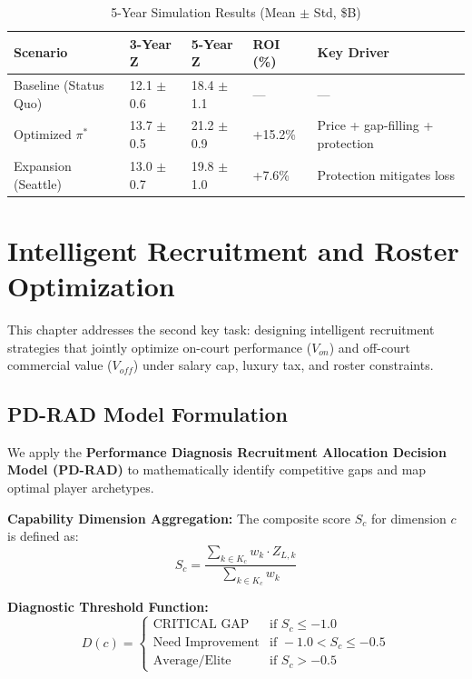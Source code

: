 \documentclass[12pt]{article}
\begin{document}
\begin{table}[H]
\centering
\caption{5-Year Simulation Results (Mean $\pm$ Std, \$B)}
\begin{tabular}{lllll}
\toprule
\textbf{Scenario} & \textbf{3-Year Z} & \textbf{5-Year Z} & \textbf{ROI (\%)} & \textbf{Key Driver} \\
\midrule
Baseline (Status Quo) & 12.1 $\pm$ 0.6 & 18.4 $\pm$ 1.1 & — & — \\
Optimized $\pi^*$ & 13.7 $\pm$ 0.5 & 21.2 $\pm$ 0.9 & +15.2\% & Price + gap-filling + protection \\
Expansion (Seattle) & 13.0 $\pm$ 0.7 & 19.8 $\pm$ 1.0 & +7.6\% & Protection mitigates loss \\
\bottomrule
\end{tabular}
\end{table}

\section{Intelligent Recruitment and Roster Optimization}
This chapter addresses the second key task: designing intelligent recruitment strategies that jointly optimize on-court performance ($V_{on}$) and off-court commercial value ($V_{off}$) under salary cap, luxury tax, and roster constraints.

\subsection{PD-RAD Model Formulation}
We apply the \textbf{Performance Diagnosis Recruitment Allocation Decision Model (PD-RAD)} to mathematically identify competitive gaps and map optimal player archetypes.

\textbf{Capability Dimension Aggregation:}
The composite score $S_c$ for dimension $c$ is defined as:
\begin{equation}
S_c = \frac{\sum_{k \in K_c} w_k \cdot Z_{L,k}}{\sum_{k \in K_c} w_k}
\end{equation}

\textbf{Diagnostic Threshold Function:}
\begin{equation}
D(c) = \begin{cases} 
\text{CRITICAL GAP} & \text{if } S_c \le -1.0 \\
\text{Need Improvement} & \text{if } -1.0 < S_c \le -0.5 \\
\text{Average/Elite} & \text{if } S_c > -0.5 
\end{cases}
\end{equation}
\end{document}
